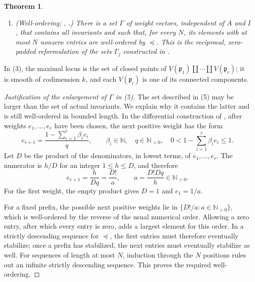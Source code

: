 \documentclass[11pt]{amsart}
\numberwithin{equation}{section}
\newtheorem{theorem}{Theorem}[section]
\theoremstyle{definition}
\newcommand{\Q}{\mathbb{Q}}
\newcommand{\N}{\mathbb{N}}
\newcommand{\fm}{\mathfrak{m}}
\newcommand{\fp}{\mathfrak{p}}
\DeclareMathOperator{\Spec}{Spec}
\begin{document}
\begin{theorem}
\begin{enumerate}
\[
  F_t=\{f\in A:\ f\in F_t(\fm)\text{ for every maximal ideal }\fm\supseteq\fp\}
  \qquad(t\in\Q).
\]
Indeed, restrict Brais's global associated center to an open neighborhood of $V(\fp)$ disjoint from the other components of the maximal locus and, level by level, glue its ideals to the unit ideal on $\Spec(A)\setminus V(\fp)$. The displayed intersection is the ideal of global sections of the resulting level-$t$ ideal sheaf. Hence $F_tA_\fm=F_t(\fm)$ for every maximal ideal $\fm\supseteq\fp$, and $F_tA_\fm=A_\fm$ for every maximal ideal $\fm\not\supseteq\fp$.
\item \emph{(Well-ordering; \cite[Section~5.1]{ATW}, \cite[Proposition~3.3.3]{Brais}.)} There is a set $\Gamma$ of weight vectors, independent of $A$ and $I$, that contains all invariants and such that, for every $N$, its elements with at most $N$ nonzero entries are well-ordered by $\preceq$. This is the reciprocal, zero-padded reformulation of the sets $\Gamma_j$ constructed in \cite[Section~3.3, especially Proposition~3.3.3]{Brais}.
\end{enumerate}
\end{theorem}

In (3), the maximal locus is the set of closed points of $V(\fp_1)\amalg\cdots\amalg V(\fp_r)$; it is smooth of codimension $k$, and each $V(\fp_i)$ is one of its connected components.

\begin{proof}[Justification of the enlargement of $\Gamma$ in (5)]
The set described in (5) may be larger than the set of actual invariants. We explain why it contains the latter and is still well-ordered in bounded length. In the differential construction of \cite[Sections~3.2--3.3]{Brais}, after weights $e_1,\ldots,e_r$ have been chosen, the next positive weight has the form
\[
  e_{r+1}=\frac{1-\sum_{i=1}^r\beta_i e_i}{q},
  \qquad \beta_i\in\N,\quad q\in\N_{>0},\quad
  0<1-\sum_{i=1}^r\beta_i e_i\le1.
\]
Let $D$ be the product of the denominators, in lowest terms, of $e_1,\ldots,e_r$. The numerator is $h/D$ for an integer $1\le h\le D$, and therefore
\[
  e_{r+1}=\frac{h}{Dq}=\frac{D!}{a},
  \qquad a=\frac{D!Dq}{h}\in\N_{>0}.
\]
For the first weight, the empty product gives $D=1$ and $e_1=1/a$.

For a fixed prefix, the possible next positive weights lie in
$\{D!/a:a\in\N_{>0}\}$, which is well-ordered by the reverse of the usual numerical order. Allowing a zero entry, after which every entry is zero, adds a largest element for this order. In a strictly descending sequence for $\preceq$, the first entries must therefore eventually stabilize; once a prefix has stabilized, the next entries must eventually stabilize as well. For sequences of length at most $N$, induction through the $N$ positions rules out an infinite strictly descending sequence. This proves the required well-ordering.
\end{proof}
\end{document}
